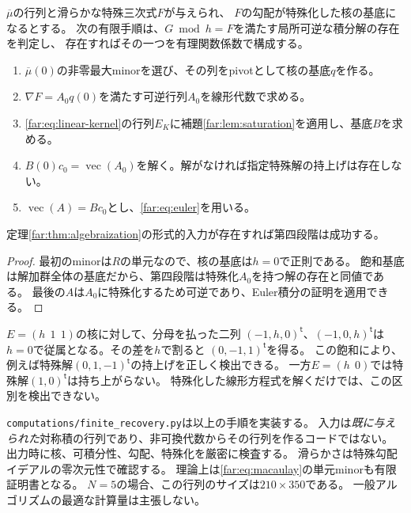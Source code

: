 \begin{proposition}[指定特殊ファイバーを保つ実行手順]\label{far:prop:algorithm}
$\overline\mu$の行列と滑らかな特殊三次式$F$が与えられ、
$F$の勾配が特殊化した核の基底になるとする。
次の有限手順は、$G\bmod h=F$を満たす局所可逆な積分解の存在を判定し、
存在すればその一つを有理関数係数で構成する。
\begin{enumerate}
\item $\overline\mu(0)$の非零最大minorを選び、その列をpivotとして核の基底$q$を作る。
\item $\nabla F=A_0q(0)$を満たす可逆行列$A_0$を線形代数で求める。
\item \eqref{far:eq:linear-kernel}の行列$E_K$に補題\ref{far:lem:saturation}を適用し、基底$B$を求める。
\item $B(0)c_0=\operatorname{vec}(A_0)$を解く。解がなければ指定特殊解の持上げは存在しない。
\item $\operatorname{vec}(A)=Bc_0$とし、\eqref{far:eq:euler}を用いる。
\end{enumerate}
定理\ref{far:thm:algebraization}の形式的入力が存在すれば第四段階は成功する。
\end{proposition}
\begin{proof}
最初のminorは$R$の単元なので、核の基底は$h=0$で正則である。
飽和基底は解加群全体の基底だから、第四段階は特殊化$A_0$を持つ解の存在と同値である。
最後の$A$は$A_0$に特殊化するため可逆であり、Euler積分の証明を適用できる。
\end{proof}

\begin{example}[一般点の核だけでは不十分]
$E=(h\ \ 1\ \ 1)$の核に対して、分母を払った二列
$(-1,h,0)^{\mathsf t}$、$(-1,0,h)^{\mathsf t}$は
$h=0$で従属となる。その差を$h$で割ると
$(0,-1,1)^{\mathsf t}$を得る。
この飽和により、例えば特殊解$(0,1,-1)^{\mathsf t}$の持上げを正しく検出できる。
一方$E=(h\ \ 0)$では特殊解$(1,0)^{\mathsf t}$は持ち上がらない。
特殊化した線形方程式を解くだけでは、この区別を検出できない。
\end{example}

\begin{remark}[検証器の範囲]
\texttt{computations/finite\_recovery.py}は以上の手順を実装する。
入力は\emph{既に与えられた}対称積の行列であり、非可換代数からその行列を作るコードではない。
出力時に核、可積分性、勾配、特殊化を厳密に検査する。
滑らかさは特殊勾配イデアルの零次元性で確認する。
理論上は\eqref{far:eq:macaulay}の単元minorも有限証明書となる。
$N=5$の場合、この行列のサイズは$210\times350$である。
一般アルゴリズムの最適な計算量は主張しない。
\end{remark}

